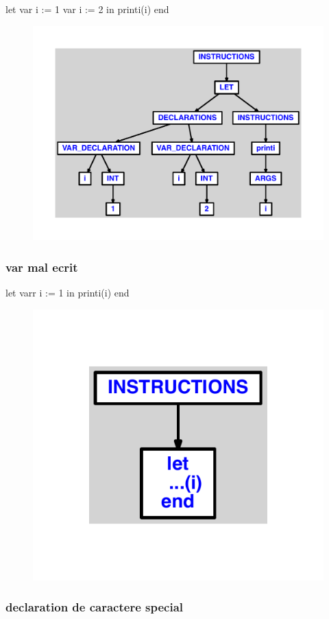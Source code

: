 \documentclass{article}
\begin{document}
\begin{verbatimtab}
let
	var i := 1
	var i := 2
in
	printi(i)
end
\end{verbatimtab}
\begin{figure}[H]\centering\includegraphics[max width=\textwidth]{ast/ast_286.pdf}\end{figure}\subsubsection{var mal ecrit}
\begin{verbatimtab}
let
	varr i := 1
in
	printi(i)
end
\end{verbatimtab}
\begin{figure}[H]\centering\includegraphics[max width=\textwidth]{ast/ast_287.pdf}\end{figure}\subsubsection{declaration de caractere special}
\end{document}
